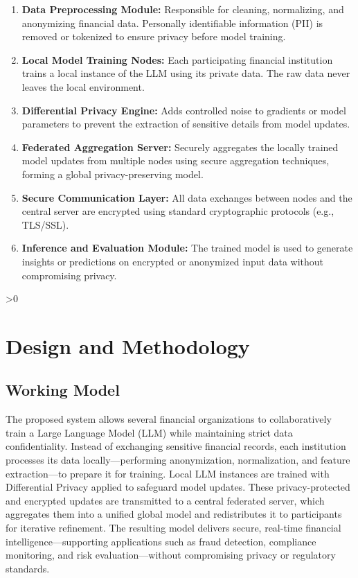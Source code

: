 \documentclass[12pt,a4paper]{report}
\let\oldchapter\chapter
\renewcommand{\chapter}{\ifnum\value{chapter}>0 \clearpage\pagestyle{fancy}\fi\oldchapter}
\begin{document}
\begin{enumerate}
    \item \textbf{Data Preprocessing Module:} Responsible for cleaning, normalizing, and anonymizing financial data. Personally identifiable information (PII) is removed or tokenized to ensure privacy before model training.
    
    \item \textbf{Local Model Training Nodes:} Each participating financial institution trains a local instance of the LLM using its private data. The raw data never leaves the local environment.
    
    \item \textbf{Differential Privacy Engine:} Adds controlled noise to gradients or model parameters to prevent the extraction of sensitive details from model updates.
    
    \item \textbf{Federated Aggregation Server:} Securely aggregates the locally trained model updates from multiple nodes using secure aggregation techniques, forming a global privacy-preserving model.
    
    \item \textbf{Secure Communication Layer:} All data exchanges between nodes and the central server are encrypted using standard cryptographic protocols (e.g., TLS/SSL).
    
    \item \textbf{Inference and Evaluation Module:} The trained model is used to generate insights or predictions on encrypted or anonymized input data without compromising privacy.
\end{enumerate}






\chapter{Design and Methodology}



\section{Working Model}
The proposed system allows several financial organizations to collaboratively train a Large Language Model (LLM) while maintaining strict data confidentiality. Instead of exchanging sensitive financial records, each institution processes its data locally—performing anonymization, normalization, and feature extraction—to prepare it for training. Local LLM instances are trained with Differential Privacy applied to safeguard model updates. These privacy-protected and encrypted updates are transmitted to a central federated server, which aggregates them into a unified global model and redistributes it to participants for iterative refinement. The resulting model delivers secure, real-time financial intelligence—supporting applications such as fraud detection, compliance monitoring, and risk evaluation—without compromising privacy or regulatory standards.
\end{document}
